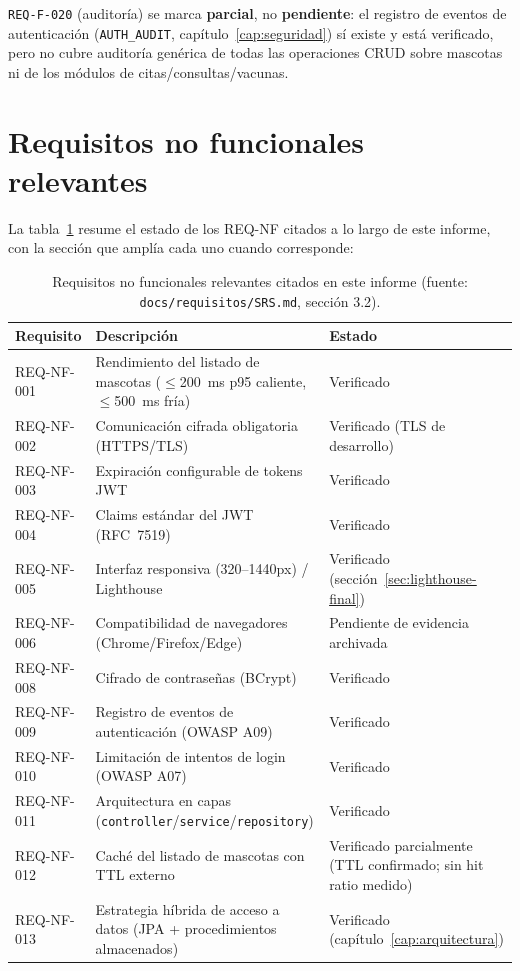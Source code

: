\texttt{REQ-F-020} (auditor\'ia) se marca \textbf{parcial}, no
\textbf{pendiente}: el registro de eventos de autenticaci\'on
(\texttt{AUTH\_AUDIT}, cap\'itulo~\ref{cap:seguridad}) s\'i existe y est\'a
verificado, pero no cubre auditor\'ia gen\'erica de todas las operaciones
CRUD sobre mascotas ni de los m\'odulos de citas/consultas/vacunas.

\section{Requisitos no funcionales relevantes}

La tabla~\ref{tab:req-nf-relevantes} resume el estado de los REQ-NF
citados a lo largo de este informe, con la secci\'on que ampl\'ia cada
uno cuando corresponde:

\begin{table}[H]
  \centering
  \small
  \caption{Requisitos no funcionales relevantes citados en este informe (fuente: \texttt{docs/requisitos/SRS.md}, secci\'on 3.2).}
  \label{tab:req-nf-relevantes}
  \begin{tabular}{@{}p{2.0cm}p{6.6cm}p{2.6cm}@{}}
    \toprule
    Requisito & Descripci\'on & Estado \\
    \midrule
    REQ-NF-001 & Rendimiento del listado de mascotas ($\leq$200~ms p95 caliente, $\leq$500~ms fr\'ia) & Verificado \\
    REQ-NF-002 & Comunicaci\'on cifrada obligatoria (HTTPS/TLS) & Verificado (TLS de desarrollo) \\
    REQ-NF-003 & Expiraci\'on configurable de tokens JWT & Verificado \\
    REQ-NF-004 & Claims est\'andar del JWT (RFC~7519) & Verificado \\
    REQ-NF-005 & Interfaz responsiva (320--1440px) / Lighthouse & Verificado (secci\'on~\ref{sec:lighthouse-final}) \\
    REQ-NF-006 & Compatibilidad de navegadores (Chrome/Firefox/Edge) & Pendiente de evidencia archivada \\
    REQ-NF-008 & Cifrado de contrase\~nas (BCrypt) & Verificado \\
    REQ-NF-009 & Registro de eventos de autenticaci\'on (OWASP A09) & Verificado \\
    REQ-NF-010 & Limitaci\'on de intentos de login (OWASP A07) & Verificado \\
    REQ-NF-011 & Arquitectura en capas (\texttt{controller}/\texttt{service}/\texttt{repository}) & Verificado \\
    REQ-NF-012 & Cach\'e del listado de mascotas con TTL externo & Verificado parcialmente (TTL confirmado; sin hit ratio medido) \\
    REQ-NF-013 & Estrategia h\'ibrida de acceso a datos (JPA + procedimientos almacenados) & Verificado (cap\'itulo~\ref{cap:arquitectura}) \\
    \bottomrule
  \end{tabular}
\end{table}

